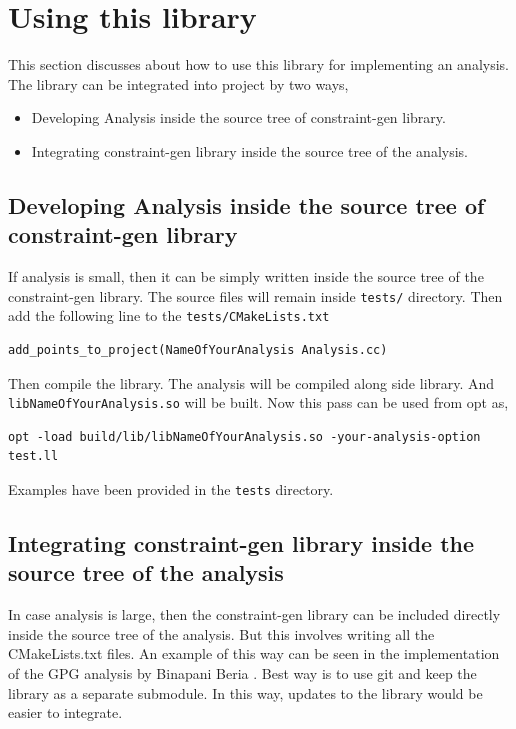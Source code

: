 \documentclass[a4paper,12pt]{report}
\begin{document}
\chapter{Using this library}
This section discusses about how to use this library for implementing an analysis.
The library can be integrated into project by two ways,

\begin{itemize}
    \item Developing Analysis inside the source tree of constraint-gen library.
    \item Integrating constraint-gen library inside the source tree of the analysis.
\end{itemize}

\section{Developing Analysis inside the source tree of constraint-gen library}
If analysis is small, then it can be simply written inside the source tree
of the constraint-gen library. The source files will remain inside \texttt{tests/}
directory. Then add the following line to the \texttt{tests/CMakeLists.txt}

\begin{verbatim}
add_points_to_project(NameOfYourAnalysis Analysis.cc)
\end{verbatim}

Then compile the library. The analysis will be compiled along side library.
And \texttt{libNameOfYourAnalysis.so} will be built. Now this pass can be used
from opt as,

\begin{verbatim}
opt -load build/lib/libNameOfYourAnalysis.so -your-analysis-option test.ll
\end{verbatim}

Examples have been provided in the \texttt{tests} directory.

\section{Integrating constraint-gen library inside the source tree of the analysis}
In case analysis is large, then the constraint-gen library can be included directly inside
the source tree of the analysis. But this involves writing all the CMakeLists.txt files.
An example of this way can be seen in the implementation of the GPG analysis by Binapani Beria \cite{Bina}.
Best way is to use git and keep the library as a separate submodule. In this way,
updates to the library would be easier to integrate.
\end{document}
